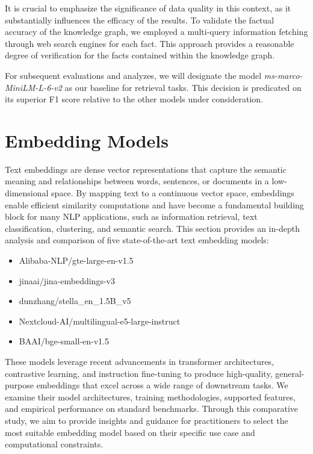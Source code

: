 It is crucial to emphasize the significance of data quality in this context, as it substantially influences the efficacy of the results.
To validate the factual accuracy of the knowledge graph, we employed a multi-query information fetching through web search engines for each fact.
This approach provides a reasonable degree of verification for the facts contained within the knowledge graph.

For subsequent evaluations and analyzes, we will designate the model \textit{ms-marco-MiniLM-L-6-v2} as our baseline for retrieval tasks.
This decision is predicated on its superior F1 score relative to the other models under consideration.


\section{Embedding Models}\label{sec:embedding-models}
Text embeddings are dense vector representations that capture the semantic meaning and relationships between words, sentences, or documents in a low-dimensional space.
By mapping text to a continuous vector space, embeddings enable efficient similarity computations and have become a fundamental building block for many NLP applications, such as information retrieval, text classification, clustering, and semantic search.
This section provides an in-depth analysis and comparison of five state-of-the-art text embedding models:

\begin{itemize}
    \item Alibaba-NLP/gte-large-en-v1.5
    \item jinaai/jina-embeddings-v3
    \item dunzhang/stella\_en\_1.5B\_v5
    \item Nextcloud-AI/multilingual-e5-large-instruct
    \item BAAI/bge-small-en-v1.5
\end{itemize}

These models leverage recent advancements in transformer architectures, contrastive learning, and instruction fine-tuning to produce high-quality, general-purpose embeddings that excel across a wide range of downstream tasks.
We examine their model architectures, training methodologies, supported features, and empirical performance on standard benchmarks.
Through this comparative study, we aim to provide insights and guidance for practitioners to select the most suitable embedding model based on their specific use case and computational constraints.

